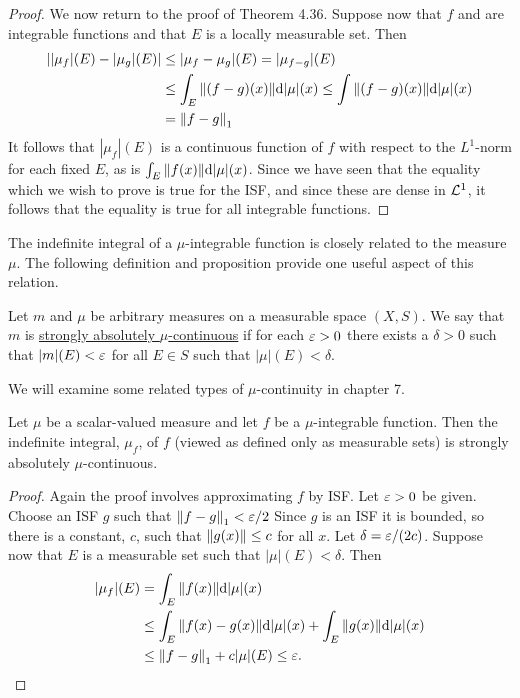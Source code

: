 \begin{proof}
We now return to the proof of Theorem 4.36. Suppose now that $f$ and are integrable functions and that $E$ is a locally measurable set. Then
\begin{align*}
    ||\mu_f|(E)-|\mu_g|(E)|&\leq|\mu_f-\mu_g|(E)=|\mu_{f-g}|(E)\\
    &\leq\int_E\norm{(f-g)(x)}\dd|\mu|(x)\leq\int\norm{(f-g)(x)}\dd|\mu|(x)\\
    &=\norm{f-g}_1
\end{align*}
It follows that $|\mu_f|(E)$ is a continuous function of $f$ with respect to the $L^1$-norm for each fixed $E$, as is $\int_E\norm{f(x)}\dd|\mu|(x)$. Since we have seen that the equality which we wish to prove is true for the ISF, and since these are dense in ${\cal L}^1$, it follows that the equality is true for all integrable functions.

\end{proof}

The indefinite integral of a $\mu$-integrable function is closely related to the measure $\mu$. The following definition and proposition provide one useful aspect of this relation.

\begin{definition}
Let $m$ and $\mu$ be arbitrary measures on a measurable space $(X,S)$. We say that $m$ is \underline{strongly absolutely $\mu$-continuous} if for each $\varepsilon>0$ there exists a $\delta>0$ such that $|m|(E)<\varepsilon$ for all $E\in S$ such that $|\mu|(E)<\delta$.
\end{definition}

We will examine some related types of $\mu$-continuity in chapter 7.

\begin{proposition}
Let $\mu$ be a scalar-valued measure and let $f$ be a $\mu$-integrable function. Then the indefinite integral, $\mu_f$, of $f$ (viewed as defined only as measurable sets) is strongly absolutely $\mu$-continuous.
\end{proposition}

\begin{proof}
Again the proof involves approximating $f$ by ISF. Let $\varepsilon>0$ be given. Choose an ISF $g$ such that $\norm{f-g}_1<\varepsilon/2$ Since $g$ is an ISF it is bounded, so there is a constant, $c$, such that $\norm{g(x)}\leq c$ for all $x$. Let $\delta=\varepsilon/(2c)$. Suppose now that $E$ is a measurable set such that $|\mu|(E)<\delta$. Then
\begin{align*}
    |\mu_f|(E)&=\int_E\norm{f(x)}\dd|\mu|(x)\\
    &\leq\int_E\norm{f(x)-g(x)}\dd|\mu|(x)+\int_E\norm{g(x)}\dd|\mu|(x)\\
    &\leq\norm{f-g}_1+c|\mu|(E)\leq\varepsilon.
\end{align*}
\end{proof}

